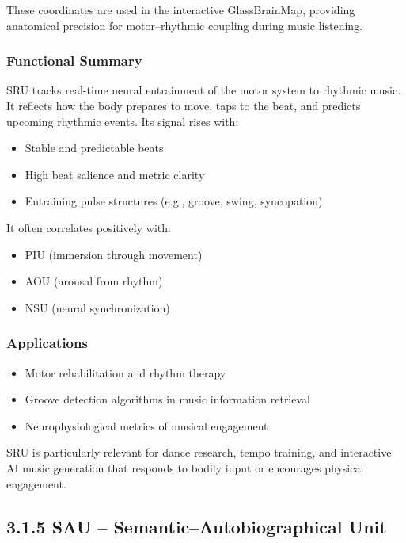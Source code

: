 \documentclass[10pt]{article}
\begin{document}
These coordinates are used in the interactive GlassBrainMap, providing anatomical precision for motor–rhythmic coupling during music listening.

\subsubsection*{Functional Summary}

SRU tracks real-time neural entrainment of the motor system to rhythmic music. It reflects how the body prepares to move, taps to the beat, and predicts upcoming rhythmic events. Its signal rises with:

\begin{itemize}
    \item Stable and predictable beats
    \item High beat salience and metric clarity
    \item Entraining pulse structures (e.g., groove, swing, syncopation)
\end{itemize}

It often correlates positively with:

\begin{itemize}
    \item PIU (immersion through movement)
    \item AOU (arousal from rhythm)
    \item NSU (neural synchronization)
\end{itemize}

\subsubsection*{Applications}

\begin{itemize}
    \item Motor rehabilitation and rhythm therapy
    \item Groove detection algorithms in music information retrieval
    \item Neurophysiological metrics of musical engagement
\end{itemize}

SRU is particularly relevant for dance research, tempo training, and interactive AI music generation that responds to bodily input or encourages physical engagement.

\subsection*{3.1.5 SAU – Semantic–Autobiographical Unit}
\end{document}
